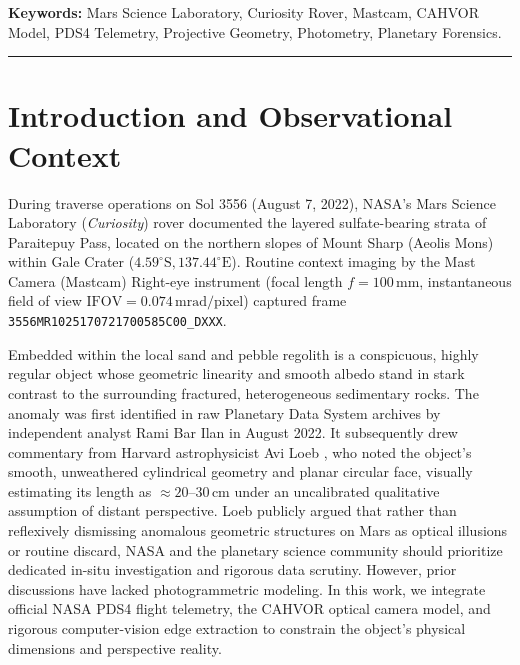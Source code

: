 \documentclass[11pt,a4paper]{article}
\newcommand{\pdsframe}{\texttt{3556MR}\allowbreak\texttt{102517}\allowbreak\texttt{0721700585C00\_DXXX}}
\begin{document}
\vspace{0.3cm}
\noindent\textbf{Keywords:} Mars Science Laboratory, Curiosity Rover, Mastcam, CAHVOR Model, PDS4 Telemetry, Projective Geometry, Photometry, Planetary Forensics.

\vspace{0.3cm}
\noindent\textcolor{sandRule}{\rule{\textwidth}{0.6pt}}
\vspace{0.3cm}

\section{Introduction and Observational Context}

During traverse operations on Sol 3556 (August 7, 2022), NASA's Mars Science Laboratory (\textit{Curiosity}) rover documented the layered sulfate-bearing strata of Paraitepuy Pass, located on the northern slopes of Mount Sharp (Aeolis Mons) within Gale Crater ($4.59^\circ\text{S}, 137.44^\circ\text{E}$). Routine context imaging by the Mast Camera (Mastcam) Right-eye instrument (focal length $f = 100\,\text{mm}$, instantaneous field of view $\text{IFOV} = 0.074\,\text{mrad/pixel}$) captured frame \pdsframe.

Embedded within the local sand and pebble regolith is a conspicuous, highly regular object whose geometric linearity and smooth albedo stand in stark contrast to the surrounding fractured, heterogeneous sedimentary rocks. The anomaly was first identified in raw Planetary Data System archives by independent analyst Rami Bar Ilan in August 2022. It subsequently drew commentary from Harvard astrophysicist Avi Loeb \cite{loeb2022}, who noted the object's smooth, unweathered cylindrical geometry and planar circular face, visually estimating its length as $\approx 20\text{--}30\,\text{cm}$ under an uncalibrated qualitative assumption of distant perspective. Loeb publicly argued that rather than reflexively dismissing anomalous geometric structures on Mars as optical illusions or routine discard, NASA and the planetary science community should prioritize dedicated in-situ investigation and rigorous data scrutiny. However, prior discussions have lacked photogrammetric modeling. In this work, we integrate official NASA PDS4 flight telemetry, the CAHVOR optical camera model, and rigorous computer-vision edge extraction to constrain the object's physical dimensions and perspective reality.
\end{document}
